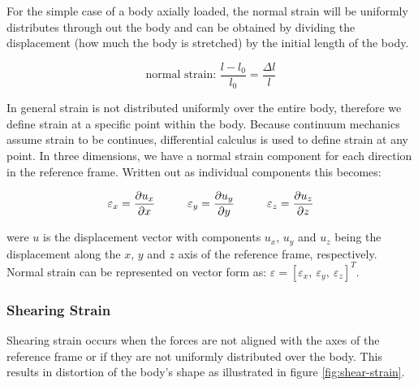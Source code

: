 For the simple case of a body axially loaded,
the normal strain will be uniformly distributes through out the body
and can be obtained by dividing the displacement (how much the body is
stretched) by the initial length of the body.

\begin{equation}
\mbox{normal strain: } \frac{l-l_0}{l_0} = \frac{\Delta l}{l}
\end{equation}

In general strain is not distributed uniformly over the entire
body, therefore we define strain at a specific point within the
body. Because continuum mechanics assume strain to be continues,
differential calculus is used to define strain at any point.
In three dimensions, we have a normal strain component
for each direction in the reference frame. Written out as individual
components this becomes: 

\begin{equation}
\label{eq:individual-normal-strain}
\varepsilon_x = \frac{\partial u_x}{\partial x} \hspace{10 mm}
\varepsilon_y = \frac{\partial u_y}{\partial y} \hspace{10 mm}
\varepsilon_z = \frac{\partial u_z}{\partial z}
\end{equation}

were $u$ is the displacement vector with components $u_x$, $u_y$ and
$u_z$ being the displacement along the $x$, $y$ and $z$ axis of the
reference frame, respectively. Normal strain can be represented on
vector form as:
$\varepsilon = [ \varepsilon_x, \ \varepsilon_y, \ \varepsilon_z ]^T$.

\subsubsection{Shearing Strain}
Shearing strain occurs when the forces are not aligned with the axes
of the reference frame or if they are not uniformly distributed over
the body. This results in distortion of the body's shape as
illustrated in figure \vref{fig:shear-strain}.


